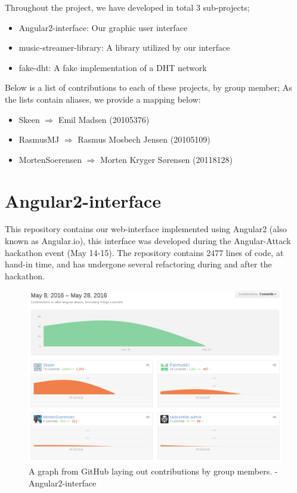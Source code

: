 Throughout the project, we have developed in total 3 sub-projects;
\begin{itemize}
\item Angular2-interface: Our graphic user interface
\item music-streamer-library: A library utilized by our interface
\item fake-dht: A fake implementation of a \acs{DHT} network
\end{itemize}
Below is a list of contributions to each of these projects, by group member;
As the lists contain aliases, we provide a mapping below:
\begin{itemize}
    \item Skeen $\Rightarrow$ Emil Madsen (20105376)
    \item RasmusMJ $\Rightarrow$ Rasmus Mosbech Jensen (20105109)
    \item MortenSoerensen $\Rightarrow$ Morten Kryger Sørensen (20118128)
\end{itemize}

\section{Angular2-interface}
This repository contains our web-interface implemented using Angular2 (also 
known as Angular.io), this interface was developed during the Angular-Attack
hackathon event (May 14-15).
\newline\newline
The repository contains 2477 lines of code, at hand-in time, and has undergone 
several refactoring during and after the hackathon.

\begin{figure}[H]
  \centering
    \includegraphics[width=\linewidth]{gfx/Angular-interface}
  \caption{A graph from GitHub laying out contributions by group members. - Angular2-interface}
  \label{fig:angular-interface}
\end{figure}

